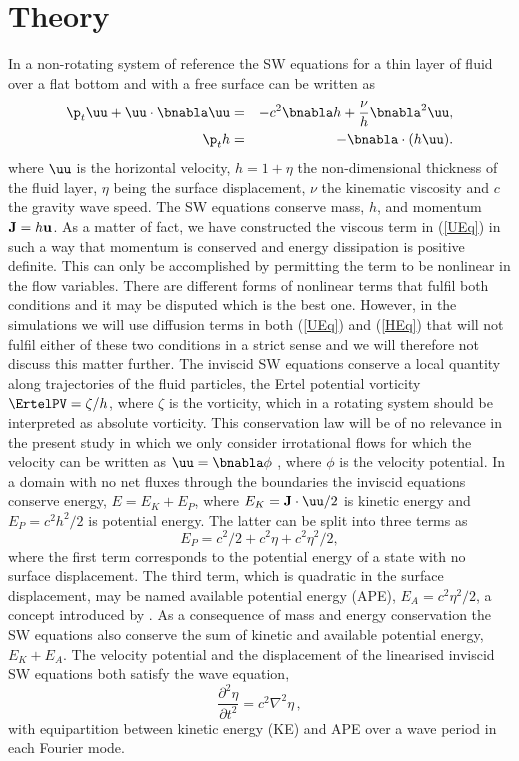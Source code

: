 \section{Theory}

In a non-rotating system of reference the SW equations for a thin layer of fluid over a flat bottom and with a free
surface can be written as  \citep[see for example][]{VallisLIVRE2006}
\begin{eqnarray} \label{UEq}
\p_t \uu + \uu\cdot \bnabla  \uu
&=& - c^2 \bnabla h + \frac{\nu}{h}  \bnabla^2 \uu,   \label{eq_uu}\\ \label{HEq}
\p_t   h    &=& - \bnabla \cdot (h \uu).  \label{eq_h}
\end{eqnarray}
where $\uu$ is the horizontal velocity, %
$h = 1 + \eta $ the non-dimensional thickness of the fluid layer,  $ \eta $ being the surface displacement,
$\nu$ the kinematic viscosity and $ c $ the gravity wave speed. The SW
equations conserve mass, $ h $, and momentum $ {\bf J} = h{\bf u} $. As a
matter of fact, we have constructed the viscous term in (\ref{UEq}) in such a
way that momentum is conserved and energy dissipation is positive definite.
This can only be accomplished by permitting the term to be nonlinear in the
flow variables. There are different forms of nonlinear terms that fulfil both
conditions and it may be disputed which is the best one. However, in the
simulations we will use diffusion terms in both (\ref{UEq}) and (\ref{HEq})
that will not fulfil either of these two conditions in a strict sense and we
will therefore not discuss this matter further. The inviscid SW equations
conserve a local
quantity along trajectories of the fluid particles, the Ertel
potential vorticity $\ErtelPV = \zeta /h$, where $\zeta  $ is the vorticity, which in a rotating system should be interpreted as absolute vorticity.  This conservation law will be of no relevance in the present study in which we only consider
irrotational flows for which the velocity can be written as $ \uu = \bnabla \phi $ , where $ \phi $ is the velocity potential. In a domain with no net fluxes through the boundaries the inviscid equations conserve energy, $ E = E_K + E_P $, where $ E_K =   {\bf J}  \cdot {\uu} /2 $ is kinetic energy and $ E_P = c^{2} h^2/2 $ is potential energy. The latter can be split into three terms as \begin{equation}
E_P = c^2/2 + c^2\eta+ c^2 \eta^2/2,
\end{equation}
where the first term corresponds to the potential energy of a state with no
surface displacement.  The third term, which is quadratic in the surface displacement, may be named available potential energy (APE),
$E_A = c^2\eta^2/2$, a concept introduced by  \cite{Lorenz1955}. As a consequence of mass and energy conservation the SW equations also conserve the sum of kinetic and available potential energy, $ E_K + E_A $.
 The velocity potential and the displacement of the linearised inviscid SW equations both satisfy the wave equation,
\begin{equation}
\frac{\partial ^2 \eta}{\partial t^2} = c^2 \nabla^2 \eta \, ,
\end{equation}
with equipartition between kinetic energy (KE) and APE over a wave period in each Fourier mode.

